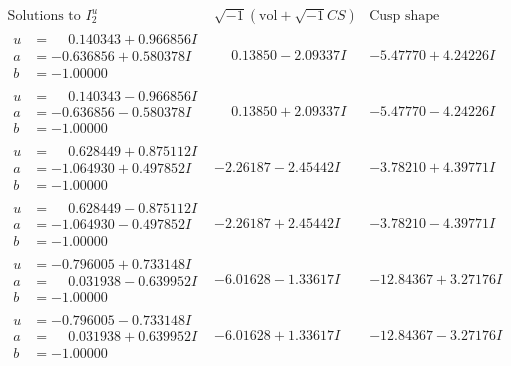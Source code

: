 \documentclass[1p]{elsarticle_modified}
\theoremstyle{definition}
\newcommand{\I}{\sqrt{-1}}
\begin{document}
$$\begin{array}{c|c|c}  
\text{Solutions to }I^u_{2}& \I (\text{vol} + \sqrt{-1}CS) & \text{Cusp shape}\\
 \hline 
\begin{aligned}
u &= \phantom{-}0.140343 + 0.966856 I \\
a &= -0.636856 + 0.580378 I \\
b &= -1.00000\phantom{ +0.000000I}\end{aligned}
 & \phantom{-}0.13850 - 2.09337 I & -5.47770 + 4.24226 I \\ \hline\begin{aligned}
u &= \phantom{-}0.140343 - 0.966856 I \\
a &= -0.636856 - 0.580378 I \\
b &= -1.00000\phantom{ +0.000000I}\end{aligned}
 & \phantom{-}0.13850 + 2.09337 I & -5.47770 - 4.24226 I \\ \hline\begin{aligned}
u &= \phantom{-}0.628449 + 0.875112 I \\
a &= -1.064930 + 0.497852 I \\
b &= -1.00000\phantom{ +0.000000I}\end{aligned}
 & -2.26187 - 2.45442 I & -3.78210 + 4.39771 I \\ \hline\begin{aligned}
u &= \phantom{-}0.628449 - 0.875112 I \\
a &= -1.064930 - 0.497852 I \\
b &= -1.00000\phantom{ +0.000000I}\end{aligned}
 & -2.26187 + 2.45442 I & -3.78210 - 4.39771 I \\ \hline\begin{aligned}
u &= -0.796005 + 0.733148 I \\
a &= \phantom{-}0.031938 - 0.639952 I \\
b &= -1.00000\phantom{ +0.000000I}\end{aligned}
 & -6.01628 - 1.33617 I & -12.84367 + 3.27176 I \\ \hline\begin{aligned}
u &= -0.796005 - 0.733148 I \\
a &= \phantom{-}0.031938 + 0.639952 I \\
b &= -1.00000\phantom{ +0.000000I}\end{aligned}
 & -6.01628 + 1.33617 I & -12.84367 - 3.27176 I \\ \hline\begin{aligned}

\end{aligned}
\end{array}$$
\end{document}
